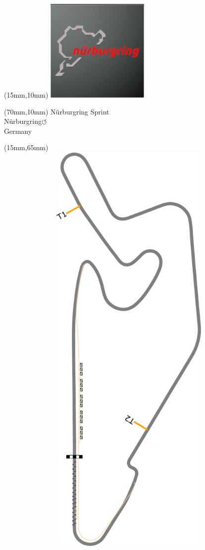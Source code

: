 \null\newpage
\begin{textblock*}{50mm}(15mm,10mm)%
\includegraphics[width=50mm]{LG/2015-05-20_00089.png}
\end{textblock*}
\begin{textblock*}{130mm}(70mm,10mm)%
{\fontsize{20}{20}\selectfont Nürburgring Sprint\\}
{\fontsize{16}{16}\selectfont Nürburgring\hfill \huge$\circlearrowleft$\\}
{\fontsize{12}{12}\selectfont Germany\\}
\end{textblock*}
\begin{textblock*}{185mm}(15mm,65mm)%
\centering
\mbox{\includegraphics[width=185mm,height=210mm,keepaspectratio]{PT/NBRSP.pdf}}
\end{textblock*}
